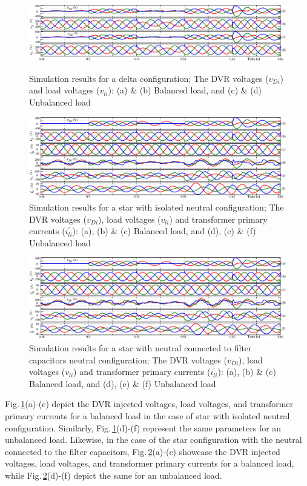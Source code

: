 \begin{figure}\centering
	\includegraphics[scale=0.7	]{figures/Appendix/Res3.pdf}
	\caption{Simulation results for a delta configuration; The DVR voltages ($v_{Di}$) and load voltages ($v_{li}$): (a) \& (b) Balanced load, and (c) \& (d) Unbalanced load} %
	\label{B1.Res3}
	\vspace*{0.5cm}
	\includegraphics[scale=0.7	]{figures/Appendix/Res4.pdf}
	\caption{Simulation results for a star with isolated neutral configuration; The DVR voltages ($v_{Di}$), load voltages ($v_{li}$) and transformer primary currents ($i^{\prime}_{li}$):  (a), (b) \& (c) Balanced load, and (d), (e) \& (f) Unbalanced load} %
	\label{B1.Res4}
\end{figure}
\begin{figure}\centering
	\includegraphics[scale=0.8	]{figures/Appendix/Res5.pdf}
	\caption{Simulation results for a star with neutral connected to filter capacitors neutral configuration; The DVR voltages ($v_{Di}$), load voltages ($v_{li}$) and transformer primary currents ($i^{\prime}_{li}$): (a), (b) \& (c) Balanced load, and (d), (e) \& (f) Unbalanced load} %
	\label{B1.Res5}
\end{figure}
Fig.\,\ref{B1.Res4}(a)-(c) depict the DVR injected voltages, load voltages, and transformer primary currents for a balanced load in the case of star with isolated neutral configuration. Similarly, Fig.\,\ref{B1.Res4}(d)-(f) represent the same parameters for an unbalanced load. Likewise, in the case of the star configuration with the neutral connected to the filter capacitors, Fig.\,\ref{B1.Res5}(a)-(c) showcase the DVR injected voltages, load voltages, and transformer primary currents for a balanced load, while Fig.\,\ref{B1.Res5}(d)-(f) depict the same for an unbalanced load.

